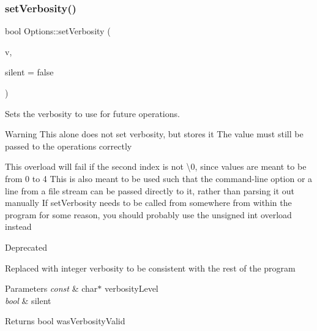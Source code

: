 \subsubsection{\texorpdfstring{setVerbosity()}{setVerbosity()}\hspace{0.1cm}{\footnotesize\ttfamily [3/4]}}
{\footnotesize\ttfamily bool Options\+::set\+Verbosity (\begin{DoxyParamCaption}\item[{const char $\ast$}]{v,  }\item[{bool}]{silent = {\ttfamily false} }\end{DoxyParamCaption})}



Sets the verbosity to use for future operations. 

\begin{DoxyWarning}{Warning}
This alone does not set verbosity, but stores it The value must still be passed to the operations correctly

This overload will fail if the second index is not \textquotesingle{}\textbackslash{}0\textquotesingle{}, since values are meant to be from 0 to 4 This is also meant to be used such that the command-\/line option or a line from a file stream can be passed directly to it, rather than parsing it out manually If set\+Verbosity needs to be called from somewhere from within the program for some reason, you should probably use the unsigned int overload instead
\end{DoxyWarning}
\begin{DoxyRefDesc}{Deprecated}
\item[\mbox{\hyperlink{deprecated__deprecated000007}{Deprecated}}]Replaced with integer verbosity to be consistent with the rest of the program\end{DoxyRefDesc}



\begin{DoxyParams}{Parameters}
{\em const} & char$\ast$ verbosity\+Level \\
\hline
{\em bool} & silent\\
\hline
\end{DoxyParams}
\begin{DoxyReturn}{Returns}
bool was\+Verbosity\+Valid 
\end{DoxyReturn}
\mbox{\label{classOptions_ae226bc6280efc0579fc059146ee4ef3f}} 
